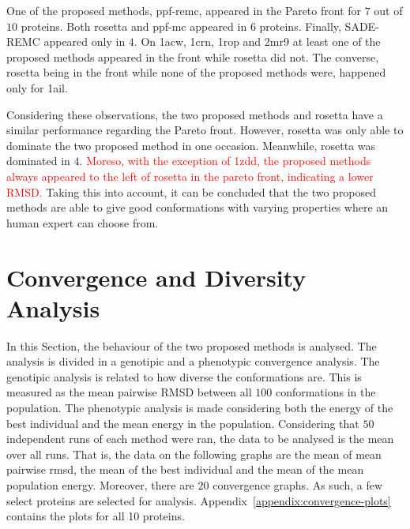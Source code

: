 One of the proposed methods, ppf-remc, appeared in the Pareto front for $7$ out of 
$10$ proteins. Both rosetta and ppf-mc appeared in $6$ proteins. Finally,
SADE-REMC appeared only in $4$. On 1acw, 1crn, 1rop and 2mr9 at least one of the
proposed methods appeared in the front while rosetta did not. The converse,
rosetta being in the front while none of the proposed methods were, happened
only for 1ail.

Considering these observations, the two proposed methods and rosetta have a
similar performance regarding the Pareto front. However, rosetta was only
able to dominate the two proposed method in one occasion. Meanwhile, rosetta was
dominated in $4$.
\textcolor{red}{
Moreso, with the exception of 1zdd, the proposed methods
always appeared to the left of rosetta in the pareto front, indicating
a lower RMSD.
}
Taking this into account, it can be concluded that the two
proposed methods are able to give good conformations with varying properties
where an human expert can choose from.

\section{Convergence and Diversity Analysis}
\label{sec:convergence-analysis}

In this Section, the behaviour of the two proposed methods is analysed. The
analysis is divided in a genotipic and a phenotypic convergence analysis. The
genotipic analysis is related to how diverse the conformations are. This is
measured as the mean pairwise RMSD between all $100$ conformations in the
population. The phenotypic analysis is made considering both the energy of
the best individual and the mean energy in the population. Considering that
$50$ independent runs of each method were ran, the data to be analysed is
the mean over all runs. That is, the data on the following graphs are
the mean of mean pairwise rmsd, the mean of the best individual and the mean
of the mean population energy. Moreover, there are $20$ convergence graphs. As such,
a few select proteins are selected for analysis.
Appendix~\ref{appendix:convergence-plots} contains the plots for all 10
proteins.

